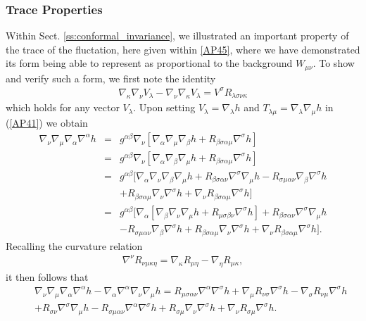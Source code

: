 \subsubsection{Trace Properties}
\label{sss:decoupling_trace_cgauge}
Within Sect. \ref{ss:conformal_invariance}, we illustrated an important property of the trace of the fluctation, here given within \eqref{AP45}, where we have demonstrated its form being able to represent as proportional to the background $W_{\mu\nu}$. To show and verify such a form, we first note the identity 
%
\begin{eqnarray}
\nabla_{\kappa}\nabla_{\nu}V_{\lambda}-\nabla_{\nu}\nabla_{\kappa}V_{\lambda}=V^{\sigma}R_{\lambda\sigma\nu\kappa}
\label{AP46}
\end{eqnarray}
%
which holds for any vector $V_{\lambda}$. Upon setting $V_{\lambda}=\nabla_{\lambda}h$ and $T_{\lambda\mu}=\nabla_{\lambda}\nabla_{\mu}h$ in (\ref{AP41}) we obtain
%
\begin{eqnarray}
\nabla_{\nu}\nabla_{\mu}\nabla_{\alpha}\nabla^{\alpha}h
&=&g^{\alpha\beta}\nabla_{\nu}[\nabla_{\alpha}\nabla_{\mu}\nabla_{\beta}h
+R_{\beta\sigma\alpha\mu}\nabla^{\sigma}h]
\nonumber\\
&=&g^{\alpha\beta}\nabla_{\nu}[\nabla_{\alpha}\nabla_{\beta}\nabla_{\mu}h
+R_{\beta\sigma\alpha\mu}\nabla^{\sigma}h]
\nonumber\\
&=&g^{\alpha\beta}[\nabla_{\alpha}\nabla_{\nu}\nabla_{\beta}\nabla_{\mu}h
+R_{\beta\sigma\alpha\nu}\nabla^{\sigma}\nabla_{\mu}h
-R_{\sigma\mu\alpha\nu}\nabla_{\beta}\nabla^{\sigma}h
\nonumber\\
&&
+R_{\beta\sigma\alpha\mu}\nabla_{\nu}\nabla^{\sigma}h
+\nabla_{\nu}R_{\beta\sigma\alpha\mu}\nabla^{\sigma}h]
\nonumber\\
&=&g^{\alpha\beta}[\nabla_{\alpha}[\nabla_{\beta}\nabla_{\nu}\nabla_{\mu}h
+R_{\mu\sigma\beta\nu}\nabla^{\sigma}h]
+R_{\beta\sigma\alpha\nu}\nabla^{\sigma}\nabla_{\mu}h
\nonumber\\
&&
-R_{\sigma\mu\alpha\nu}\nabla_{\beta}\nabla^{\sigma}h
+R_{\beta\sigma\alpha\mu}\nabla_{\nu}\nabla^{\sigma}h
+\nabla_{\nu}R_{\beta\sigma\alpha\mu}\nabla^{\sigma}h].
\label{AP47}
\end{eqnarray}
%
Recalling the curvature relation 
%
\begin{eqnarray}
\nabla^{\nu}R_{\nu\mu\kappa\eta}=\nabla_{\kappa}R_{\mu\eta}-\nabla_{\eta}R_{\mu\kappa},
\label{AP48}
\end{eqnarray}
%
it then follows that 
%
\begin{eqnarray}
&&\nabla_{\nu}\nabla_{\mu}\nabla_{\alpha}\nabla^{\alpha}h-\nabla_{\alpha}\nabla^{\alpha}\nabla_{\nu}\nabla_{\mu}h
=R_{\mu\sigma\alpha\nu}\nabla^{\alpha}\nabla^{\sigma}h
+\nabla_{\mu}R_{\nu\sigma}\nabla^{\sigma}h
-\nabla_{\sigma}R_{\nu\mu}
\nabla^{\sigma}h\nonumber\\
&&+R_{\sigma\nu}\nabla^{\sigma}\nabla_{\mu}h
-R_{\sigma\mu\alpha\nu}\nabla^{\alpha}\nabla^{\sigma}h
+R_{\sigma\mu}\nabla_{\nu}\nabla^{\sigma}h
+\nabla_{\nu}R_{\sigma\mu}\nabla^{\sigma}h.
\label{AP49}
\end{eqnarray}
